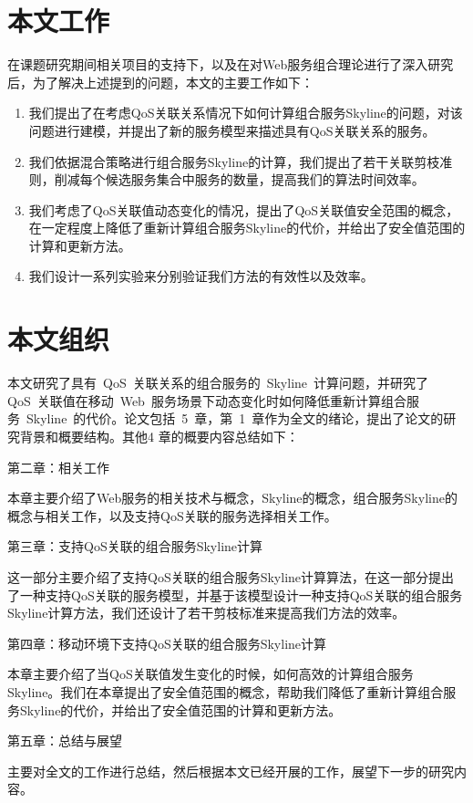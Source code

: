 \section{本文工作}

在课题研究期间相关项目的支持下，以及在对Web服务组合理论进行了深入研究后，为了解决上述提到的问题，本文的主要工作如下：

\begin{enumerate}

    \item 我们提出了在考虑QoS关联关系情况下如何计算组合服务Skyline的问题，对该问题进行建模，并提出了新的服务模型来描述具有QoS关联关系的服务。

    \item 我们依据混合策略进行组合服务Skyline的计算，我们提出了若干关联剪枝准则，削减每个候选服务集合中服务的数量，提高我们的算法时间效率。

    \item 我们考虑了QoS关联值动态变化的情况，提出了QoS关联值安全范围的概念，在一定程度上降低了重新计算组合服务Skyline的代价，并给出了安全值范围的计算和更新方法。

    \item 我们设计一系列实验来分别验证我们方法的有效性以及效率。

\end{enumerate}

\section{本文组织}

本文研究了具有~QoS~关联关系的组合服务的~Skyline~计算问题，并研究了QoS~关联值在移动~Web~服务场景下动态变化时如何降低重新计算组合服务~Skyline~的代价。论文包括~5~章，第~1~章作为全文的绪论，提出了论文的研究背景和概要结构。其他4 章的概要内容总结如下：

第二章：相关工作

本章主要介绍了Web服务的相关技术与概念，Skyline的概念，组合服务Skyline的概念与相关工作，以及支持QoS关联的服务选择相关工作。

第三章：支持QoS关联的组合服务Skyline计算

这一部分主要介绍了支持QoS关联的组合服务Skyline计算算法，在这一部分提出了一种支持QoS关联的服务模型，并基于该模型设计一种支持QoS关联的组合服务Skyline计算方法，我们还设计了若干剪枝标准来提高我们方法的效率。

第四章：移动环境下支持QoS关联的组合服务Skyline计算

本章主要介绍了当QoS关联值发生变化的时候，如何高效的计算组合服务Skyline。我们在本章提出了安全值范围的概念，帮助我们降低了重新计算组合服务Skyline的代价，并给出了安全值范围的计算和更新方法。

第五章：总结与展望

主要对全文的工作进行总结，然后根据本文已经开展的工作，展望下一步的研究内容。

